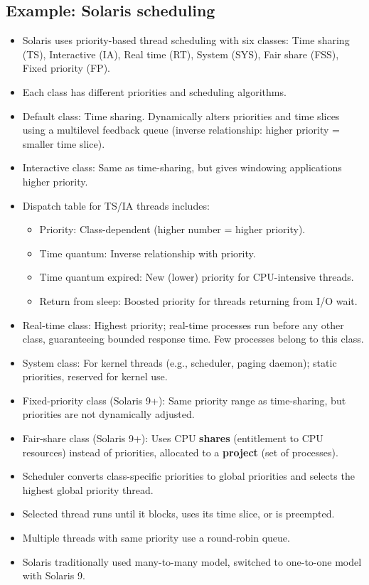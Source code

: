 \subsection{Example: Solaris scheduling}
\begin{itemize}
    \item Solaris uses priority-based thread scheduling with six classes: Time sharing (TS), Interactive (IA), Real time (RT), System (SYS), Fair share (FSS), Fixed priority (FP).
    \item Each class has different priorities and scheduling algorithms.
    \item Default class: Time sharing. Dynamically alters priorities and time slices using a multilevel feedback queue (inverse relationship: higher priority = smaller time slice).
    \item Interactive class: Same as time-sharing, but gives windowing applications higher priority.
    \item Dispatch table for TS/IA threads includes:
        \begin{itemize}
            \item Priority: Class-dependent (higher number = higher priority).
            \item Time quantum: Inverse relationship with priority.
            \item Time quantum expired: New (lower) priority for CPU-intensive threads.
            \item Return from sleep: Boosted priority for threads returning from I/O wait.
        \end{itemize}
    \item Real-time class: Highest priority; real-time processes run before any other class, guaranteeing bounded response time. Few processes belong to this class.
    \item System class: For kernel threads (e.g., scheduler, paging daemon); static priorities, reserved for kernel use.
    \item Fixed-priority class (Solaris 9+): Same priority range as time-sharing, but priorities are not dynamically adjusted.
    \item Fair-share class (Solaris 9+): Uses CPU \textbf{shares} (entitlement to CPU resources) instead of priorities, allocated to a \textbf{project} (set of processes).
    \item Scheduler converts class-specific priorities to global priorities and selects the highest global priority thread.
    \item Selected thread runs until it blocks, uses its time slice, or is preempted.
    \item Multiple threads with same priority use a round-robin queue.
    \item Solaris traditionally used many-to-many model, switched to one-to-one model with Solaris 9.
\end{itemize}

